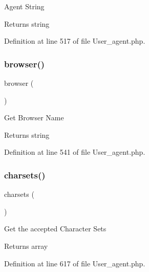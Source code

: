Agent String

\begin{DoxyReturn}{Returns}
string 
\end{DoxyReturn}


Definition at line 517 of file User\+\_\+agent.\+php.

\mbox{\label{class_c_i___user__agent_a7dbfb19bfe0682921dcfad5de8dc987c}} 
\subsubsection{\texorpdfstring{browser()}{browser()}}
{\footnotesize\ttfamily browser (\begin{DoxyParamCaption}{ }\end{DoxyParamCaption})}

Get Browser Name

\begin{DoxyReturn}{Returns}
string 
\end{DoxyReturn}


Definition at line 541 of file User\+\_\+agent.\+php.

\mbox{\label{class_c_i___user__agent_a1c3819a3fa2777b0b0f2c8ab5d97d833}} 
\subsubsection{\texorpdfstring{charsets()}{charsets()}}
{\footnotesize\ttfamily charsets (\begin{DoxyParamCaption}{ }\end{DoxyParamCaption})}

Get the accepted Character Sets

\begin{DoxyReturn}{Returns}
array 
\end{DoxyReturn}


Definition at line 617 of file User\+\_\+agent.\+php.

\mbox{\label{class_c_i___user__agent_a3a0c84a9f4a781e53c7529af8a5075ae}} 
